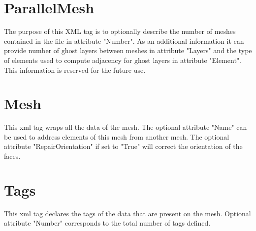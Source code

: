 \documentclass[14pt]{article}
\begin{document}
\section{ParallelMesh}
The purpose of this XML tag is to optionally describe the number of meshes contained in the file in attribute "Number". As an additional information it can provide number of ghost layers between meshes in attribute "Layers" and the type of elements used to compute adjacency for ghost layers in attribute "Element". This information is reserved for the future use.
\section{Mesh}
This xml tag wraps all the data of the mesh. The optional attribute "Name" can be used to address elements of this mesh from another mesh. The optional attribute "RepairOrientation" if set to "True" will correct the orientation of the faces.
\section{Tags}
This xml tag declares the tags of the data that are present on the mesh. Optional attribute "Number" corresponds to the total number of tags defined.
\end{document}
